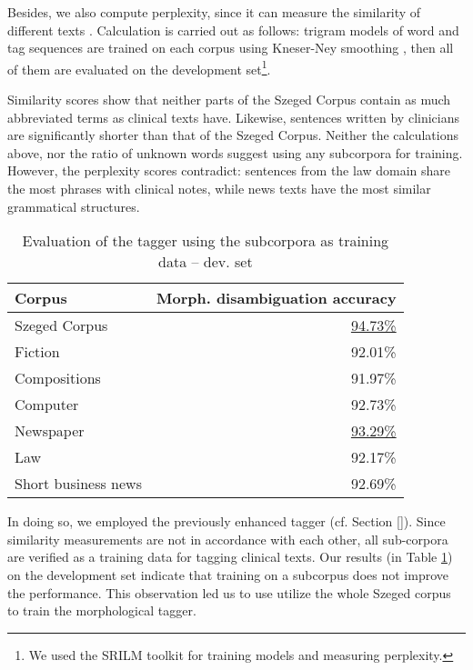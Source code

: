 Besides, we also compute perplexity, since it can measure the similarity of different texts \cite{kilgarriff1998measures}. 
Calculation is carried out as follows: trigram models of word and tag sequences are trained on each corpus using Kneser-Ney smoothing \cite{}, then all of them are evaluated on the development set\footnote{We used the SRILM toolkit \cite{stolcke2002srilm} for training models and measuring perplexity.}.

Similarity scores show that neither parts of the Szeged Corpus contain as much abbreviated terms as clinical texts have. 
Likewise, sentences written by clinicians are significantly shorter than that of the Szeged Corpus. 
Neither the calculations above, nor the ratio of unknown words suggest using any subcorpora for training. 
However, the perplexity scores contradict: sentences from the law domain share the most phrases with clinical notes, while news texts have the most similar grammatical structures. 

\begin{table}[h]
\centering
\caption{Evaluation of the tagger using the subcorpora as training data -- dev. set}
\label{tab:eval_subcorpora}
\begin{tabular}{ l r } 
\hline
Corpus & Morph. disambiguation accuracy \\
\hline
Szeged Corpus & \underline{94.73\%} \\
\hspace{0.2cm} Fiction & 92.01\% \\
\hspace{0.2cm} Compositions & 91.97\% \\
\hspace{0.2cm} Computer & 92.73\% \\
\hspace{0.2cm} Newspaper & \underline{93.29\%} \\
\hspace{0.2cm} Law & 92.17\% \\
\hspace{0.2cm} Short business news & 92.69\% \\
\hline
\end{tabular}
\end{table}

In doing so, we employed the previously enhanced tagger (cf. Section \ref{}). 
Since similarity measurements are not in accordance with each other, all sub-corpora are verified as a training data for tagging clinical texts. 
Our results (in Table  \ref{tab:eval_subcorpora}) on the development set indicate that training on a  subcorpus does not improve the performance. %
This observation led us to use utilize the whole Szeged corpus to train the morphological tagger.

